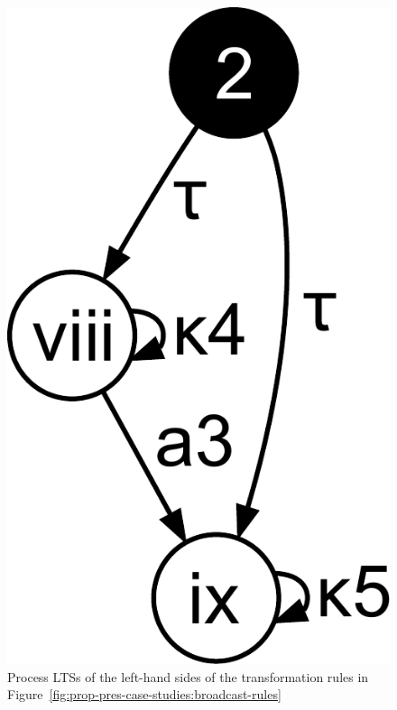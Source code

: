 \begin{figure}[hbt]
\begin{minipage}[b]{4cm}
    \includegraphics[scale=0.2]{prop-pres-case-studies/figs/broadcast-rule3-lhs}
  \end{minipage}
  \caption{Process LTSs of the left-hand sides of the transformation rules in Figure~\ref{fig:prop-pres-case-studies:broadcast-rules}}
  \label{fig:prop-pres-case-studies:broadcast-lhs}
\end{figure} 
